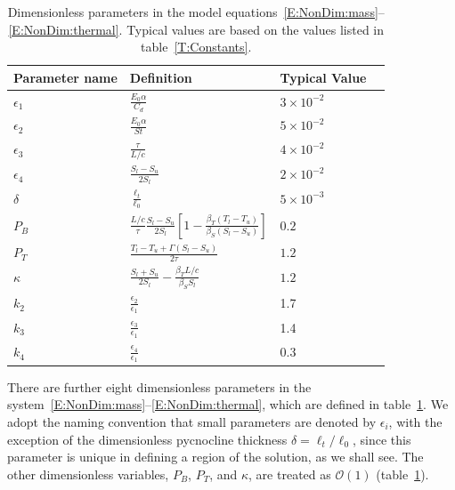 \documentclass[openacc]{rsproca_new}%
\newcommand{\order}[1]{\mathcal{O}(#1)}
\newcommand{\epsone}{\epsilon_{1}} %
\newcommand{\epstwo}{\epsilon_{2}} %
\newcommand{\epsthree}{\epsilon_{3}} %
\newcommand{\epsfour}{\epsilon_{4}}
\newcommand{\Pb}{\textit{P}_B}  %
\newcommand{\lt}{\delta} %
\newcommand{\Pt}{\textit{P}_T}
\begin{document}
\begin{table}[!h]
\caption{Dimensionless parameters in the model equations~\eqref{E:NonDim:mass}--\eqref{E:NonDim:thermal}. Typical values are based on the values listed in table~\ref{T:Constants}.}\label{T:Dimensionless_Parameters}
\begin{center}
\begin{tabular}{llll}

Parameter name  & Definition   & Typical Value \\
\hline 
\vspace{2pt}
\vspace{3pt}$\epsone$ & $  \frac{E_0 \alpha}{C_d} $  &$ 3 \times 10^{-2}$ \\
\vspace{2pt}$\epstwo$ & $  \frac{E_0 \alpha}{St} $ & $ 5 \times 10^{-2}$ \\
\vspace{2pt}$\epsthree$ & $  \frac{\tau}{L/c} $ & $ 4 \times 10^{-2}$ \\
\vspace{2pt}$\epsfour$ & $  \frac{S_l - S_u}{2 S_l} $  &$ 2 \times 10^{-2}$ \\
\vspace{2pt}$\lt$ & $  \frac{\ell_t}{\ell_0} $ & $  5 \times 10^{-3}$ \\
\vspace{2pt}$\Pb$ & $  \frac{L/c}{ \tau}\frac{S_l - S_u}{2S_l}\left[1 - \frac{\beta_T (T_l - T_u)}{\beta_S (S_l - S_u)}\right]$   & $  0.2$ \\
\vspace{2pt}$\Pt$ & $ \frac{T_l - T_u + \Gamma( S_l - S_u)}{2 \tau}$ & $  1.2$ \\
\vspace{2pt}$\kappa$ & $ \frac{S_l + S_u}{2S_l} -  \frac{\beta_T L/c}{ \beta_S S_l}$ &  $  1.2$ \\
\hline
\vspace{2pt}$k_2$ & $\frac{\epstwo}{\epsone}$ & 1.7\\
\vspace{2pt}$k_3$ & $\frac{\epsthree} {\epsone}$ & 1.4\\
\vspace{2pt}$k_4$ & $\frac{\epsfour}{\epsone}$ & 0.3\\
\end{tabular}
\end{center}
\vspace*{-4pt}
\end{table}
 
There are further eight dimensionless parameters in the system~\eqref{E:NonDim:mass}--\eqref{E:NonDim:thermal}, which are defined in table~\ref{T:Dimensionless_Parameters}. We adopt the naming convention that small parameters are denoted by $\epsilon_i$, with the exception of the dimensionless pycnocline thickness $\delta = \ell_t / \ell_0$, since this parameter is unique in defining a region of the solution, as we shall see. The other dimensionless variables, $\Pb$, $\Pt$, and $\kappa$, are treated as $\order{1}$ (table~\ref{T:Dimensionless_Parameters}).
\end{document}
